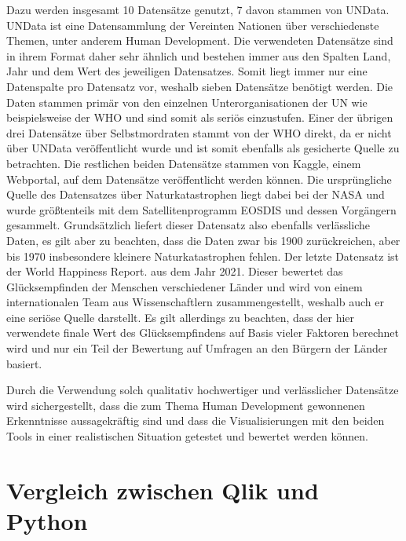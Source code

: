 \documentclass[12pt]{article}
\begin{document}
	Dazu werden insgesamt 10 Datensätze genutzt, 7 davon stammen von UNData. UNData ist eine Datensammlung der Vereinten Nationen über verschiedenste Themen, unter anderem Human Development. Die verwendeten Datensätze sind in ihrem Format daher sehr ähnlich und bestehen immer aus den Spalten Land, Jahr und dem Wert des jeweiligen Datensatzes. Somit liegt immer nur eine Datenspalte pro Datensatz vor, weshalb sieben Datensätze benötigt werden. Die Daten stammen primär von den einzelnen Unterorganisationen der UN wie beispielsweise der WHO und sind somit als seriös einzustufen. Einer der übrigen drei Datensätze über Selbstmordraten stammt von der WHO direkt, da er nicht über UNData veröffentlicht wurde und ist somit ebenfalls als gesicherte Quelle zu betrachten. Die restlichen beiden Datensätze stammen von Kaggle, einem Webportal, auf dem Datensätze veröffentlicht werden können. Die ursprüngliche Quelle des Datensatzes über Naturkatastrophen liegt dabei bei der NASA und wurde größtenteils mit dem Satellitenprogramm EOSDIS und dessen Vorgängern gesammelt. Grundsätzlich liefert dieser Datensatz also ebenfalls verlässliche Daten, es gilt aber zu beachten, dass die Daten zwar bis 1900 zurückreichen, aber bis 1970 insbesondere kleinere Naturkatastrophen fehlen. Der letzte Datensatz ist der World Happiness Report.
	aus dem Jahr 2021. Dieser bewertet das Glücksempfinden der Menschen verschiedener Länder und wird von einem internationalen Team aus Wissenschaftlern zusammengestellt, weshalb auch er eine seriöse Quelle darstellt. Es gilt allerdings zu beachten, dass der hier verwendete finale Wert des Glücksempfindens auf Basis vieler Faktoren berechnet wird und nur ein Teil der Bewertung auf Umfragen an den Bürgern der Länder basiert.
	
	Durch die Verwendung solch qualitativ hochwertiger und verlässlicher Datensätze wird sichergestellt, dass die zum Thema Human Development gewonnenen Erkenntnisse aussagekräftig sind und dass die Visualisierungen mit den beiden Tools in einer realistischen Situation getestet und bewertet werden können.
	\section{Vergleich zwischen Qlik und Python}
	
\end{document}
